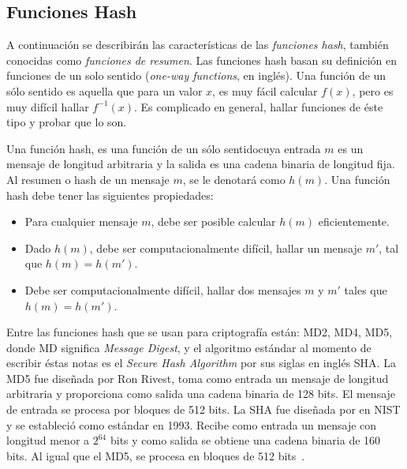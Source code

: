 \subsection{Funciones Hash}
A continuaci\'on se describir\'an las caracter\'isticas de las {\it funciones
hash}, tambi\'en conocidas como {\it funciones de resumen}. Las funciones hash basan
su definici\'on en funciones de un solo sentido  ({\it one-way functions}, en ingl\'es).
Una funci\'on de un s\'olo sentido es aquella que para un valor $x$, es 
muy f\'acil calcular $f(x)$, pero es muy dif\'icil hallar $f^{-1}(x)$. Es 
complicado en general, hallar funciones de \'este tipo y probar que lo 
son.
\begin{definition}
Una funci\'on hash, es una funci\'on de un s\'olo sentidocuya entrada $m$
 es un mensaje de longitud arbitraria
y la salida es una cadena binaria de longitud fija. Al resumen o hash de 
un mensaje $m$, se le denotar\'a como $h(m)$. Una funci\'on hash debe
tener las siguientes propiedades:
\begin{itemize}
\item Para cualquier mensaje $m$, debe ser posible calcular $h(m)$ 
eficientemente. 
\item Dado $h(m)$, debe ser computacionalmente dif\'icil, hallar un mensaje
$m'$, tal que $h(m)=h(m')$.
\item Debe ser computacionalmente dif\'icil, hallar dos mensajes $m$ y $m'$ 
tales que $h(m)=h(m')$.
\end{itemize}
\end{definition}
 
Entre las funciones hash que se usan para criptograf\'ia est\'an: MD2, MD4,
MD5, donde MD significa {\it Message Digest}, y el algoritmo est\'andar al momento de escribir \'estas notas es el {\it Secure Hash Algorithm} por sus siglas
en ingl\'es SHA.
  La MD5 fue dise\~nada por Ron Rivest, toma como entrada un mensaje de 
longitud arbitraria y proporciona como salida una cadena binaria de 128 bits.
El mensaje de entrada se procesa por bloques de 512 bits. 
  La SHA fue dise\~nada por en NIST y se estableci\'o como est\'andar
en 1993. Recibe como entrada un mensaje con longitud menor a $2^{64}$ bits y
como salida se obtiene una cadena binaria de 160 bits. Al igual que el
MD5, se procesa en bloques de 512 bits~\cite{modes}.



